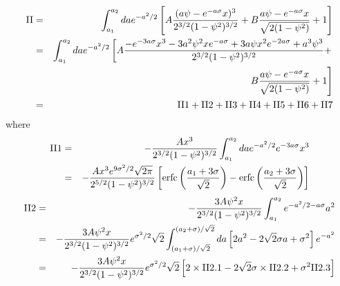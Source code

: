 \documentclass{book}
\begin{document}
\begin{eqnarray*}
  \text{II} &=& \int_{a_1}^{a_2} da e^{-a^2/2} \left[
    A {(a\psi - e^{-a\sigma} x)^3\over 2^{3/2} (1 - \psi^2)^{3/2}} +
    B{a\psi - e^{-a\sigma}x \over \sqrt{2(1-\psi^2)}} + 1
  \right] \\
  &=& \int_{a_1}^{a_2} da e^{-a^2/2} \left[
    A{-e^{-3a\sigma}x^3 - 3a^2\psi^2 x e^{-a\sigma}
      +3 a \psi x^2 e^{-2a\sigma} + a^3\psi^3
      \over
      2^{3/2} (1 - \psi^2)^{3/2}
    } + \right.\\
    && \left. B{a\psi - e^{-a\sigma}x
    \over
    \sqrt{2(1 - \psi^2)}
  } + 1
\right] \\
&=& \text{II1} + \text{II2} + \text{II3} + \text{II4} + \text{II5} + \text{II6} + \text{II7}
\end{eqnarray*}
where
\begin{eqnarray*}
  \text{II1} &=& -{Ax^3 \over 2^{3/2} (1 -
    \psi^2)^{3/2}}\int_{a_1}^{a_2} da e^{-a^2/2} e^{-3a\sigma}x^3 \\
  &=& -{Ax^3e^{9\sigma^2/2}\sqrt{2\pi} \over 2^{5/2} (1 -
    \psi^2)^{3/2}} \left[
    \text{erfc}\left(a_1 + 3\sigma \over \sqrt 2\right)
    - \text{erfc}\left(a_2 + 3\sigma \over \sqrt 2\right)
  \right]
\end{eqnarray*}
\begin{eqnarray*}
  \text{II2} &=& -{3A\psi^2 x \over 2^{3/2} (1 - \psi^2)^{3/2}}
  \int_{a_1}^{a_2} e^{-a^2/2 - a\sigma} a^2 \\
  &=& -{3A\psi^2 x \over 2^{3/2} (1 - \psi^2)^{3/2}} e^{\sigma^2/2}
  \sqrt 2 \int_{(a_1+\sigma)/\sqrt 2}^{(a_2+\sigma)/\sqrt 2} da \left[
    2a^2 - 2\sqrt{2}\sigma a + \sigma^2
  \right] e^{-a^2} \\
  &=& -{3A\psi^2 x \over 2^{3/2} (1 - \psi^2)^{3/2}} e^{\sigma^2/2}
  \sqrt 2 \left[
    2\times\text{II2.1} -2\sqrt{2}\sigma\times\text{II2.2} + \sigma^2\text{II2.3}
  \right]
\end{eqnarray*}
\end{document}
